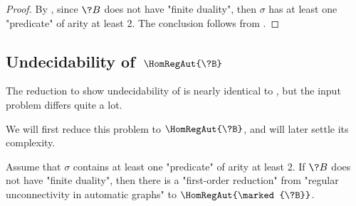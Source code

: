 \begin{proof}
	By , since $\?B$ does not have "finite duality",
	then $\sigma$ has at least one "predicate" of arity at least 2.
	The conclusion follows from .
\end{proof}

\subsection{Undecidability of \,$\HomRegAut{\?B}$}
\label{sec:undecidability-homreg}

The reduction to show undecidability of is nearly identical to ,
but the input problem differs quite a lot.

We will first reduce this problem to $\HomRegAut{\?B}$,
and will later settle its complexity.

\begin{lemma}
	\AP\label{lem:reduction-hom-reg}
	Assume that $\sigma$ contains at least one "predicate" of arity at least 2.
	If $\?B$ does not have "finite duality", then there is a "first-order reduction"
	from "regular unconnectivity in automatic graphs"
	to $\HomRegAut{\marked{\?B}}$.
\end{lemma}

